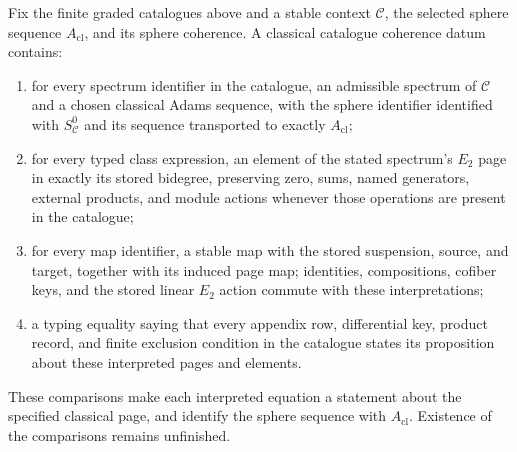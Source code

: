 \begin{definition}
  \label{def:classical-catalogue-coherence}
  \notready
  Fix the finite graded catalogues above and a stable context $\mathcal C$,
  the selected sphere sequence $A_{\mathrm{cl}}$, and its sphere coherence.
  A classical catalogue coherence datum contains:
  \begin{enumerate}
    \item for every spectrum identifier in the catalogue, an admissible spectrum of
      $\mathcal C$ and a chosen classical Adams sequence, with the sphere
      identifier identified with $S^0_{\mathcal C}$ and its sequence
      transported to exactly $A_{\mathrm{cl}}$;
    \item for every typed class expression, an element of the stated spectrum's
      $E_2$ page in exactly its stored bidegree, preserving zero, sums, named
      generators, external products, and module actions whenever those
      operations are present in the catalogue;
    \item for every map identifier, a stable map with the stored suspension,
      source, and target, together with its induced page map; identities,
      compositions, cofiber keys, and the stored linear $E_2$ action commute
      with these interpretations;
    \item a typing equality saying that every appendix row, differential key,
      product record, and finite exclusion condition in the catalogue states its proposition
      about these interpreted pages and elements.
  \end{enumerate}
  These comparisons make each interpreted equation a statement about the
  specified classical page, and identify the sphere sequence with
  $A_{\mathrm{cl}}$. Existence of the comparisons remains unfinished.
\end{definition}
